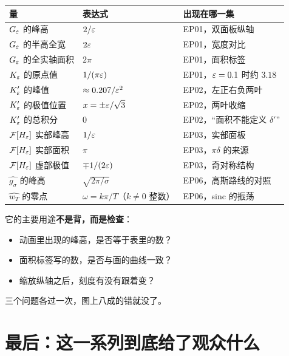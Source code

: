 \begin{center}
\small
\renewcommand{\arraystretch}{1.4}
\begin{tabularx}{\textwidth}{@{}L{4.2cm}L{4.0cm}Y@{}}
\toprule
量 & 表达式 & 出现在哪一集 \\
\midrule
$G_\varepsilon$ 的峰高 & $2/\varepsilon$ & EP01，双面板纵轴 \\
$G_\varepsilon$ 的半高全宽 & $2\varepsilon$ & EP01，宽度对比 \\
$G_\varepsilon$ 的全实轴面积 & $2\pi$ & EP01，面积标签 \\
$K_\varepsilon$ 的原点值 & $1/(\pi\varepsilon)$ & EP01，$\varepsilon=0.1$ 时约 $3.18$ \\
$K_\varepsilon'$ 的峰值 & $\approx0.207/\varepsilon^{2}$ & EP02，左正右负两叶 \\
$K_\varepsilon'$ 的极值位置 & $x=\pm\varepsilon/\sqrt3$ & EP02，两叶收缩 \\
$K_\varepsilon'$ 的总积分 & $0$ & EP02，“面积不能定义 $\delta'$” \\
$\mathcal{F}[H_\varepsilon]$ 实部峰高 & $1/\varepsilon$ & EP03，实部面板 \\
$\mathcal{F}[H_\varepsilon]$ 实部面积 & $\pi$ & EP03，$\pi\delta$ 的来源 \\
$\mathcal{F}[H_\varepsilon]$ 虚部极值 & $\mp1/(2\varepsilon)$ & EP03，奇对称结构 \\
$\widehat{g_\sigma}$ 的峰高 & $\sqrt{2\pi/\sigma}$ & EP06，高斯路线的对照 \\
$\widehat{w_T}$ 的零点 & $\omega=k\pi/T$（$k\neq0$ 整数） & EP06，sinc 的振荡 \\
\bottomrule
\end{tabularx}
\end{center}

\begin{notebox}[怎么用这张表]
它的主要用途\textbf{不是背，而是检查}：
\begin{itemize}[leftmargin=1.4em,itemsep=0.2em]
\item 动画里出现的峰高，是否等于表里的数？
\item 面积标签写的数，是否与画的曲线一致？
\item 缩放纵轴之后，刻度有没有跟着变？
\end{itemize}
三个问题各过一次，图上八成的错就没了。
\end{notebox}

\section{最后：这一系列到底给了观众什么}


